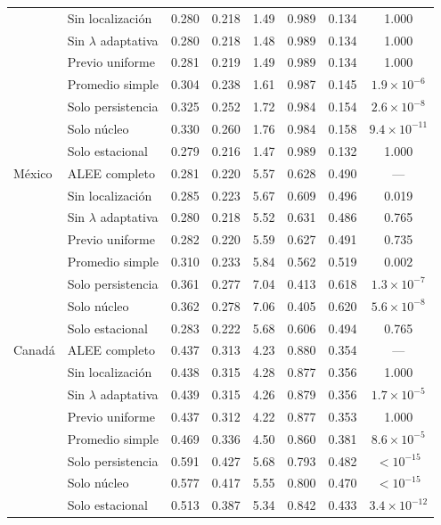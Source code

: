 \begin{longtable}{llcccccc}
 & Sin localización & 0.280 & 0.218 & 1.49 & 0.989 & 0.134 & 1.000 \\
 & Sin $\lambda$ adaptativa & 0.280 & 0.218 & 1.48 & 0.989 & 0.134 & 1.000 \\
 & Previo uniforme & 0.281 & 0.219 & 1.49 & 0.989 & 0.134 & 1.000 \\
 & Promedio simple & 0.304 & 0.238 & 1.61 & 0.987 & 0.145 & $1.9\times10^{-6}$ \\
 & Solo persistencia & 0.325 & 0.252 & 1.72 & 0.984 & 0.154 & $2.6\times10^{-8}$ \\
 & Solo núcleo & 0.330 & 0.260 & 1.76 & 0.984 & 0.158 & $9.4\times10^{-11}$ \\
 & Solo estacional & 0.279 & 0.216 & 1.47 & 0.989 & 0.132 & 1.000 \\
\midrule
México & ALEE completo & 0.281 & 0.220 & 5.57 & 0.628 & 0.490 & --- \\
 & Sin localización & 0.285 & 0.223 & 5.67 & 0.609 & 0.496 & 0.019 \\
 & Sin $\lambda$ adaptativa & 0.280 & 0.218 & 5.52 & 0.631 & 0.486 & 0.765 \\
 & Previo uniforme & 0.282 & 0.220 & 5.59 & 0.627 & 0.491 & 0.735 \\
 & Promedio simple & 0.310 & 0.233 & 5.84 & 0.562 & 0.519 & 0.002 \\
 & Solo persistencia & 0.361 & 0.277 & 7.04 & 0.413 & 0.618 & $1.3\times10^{-7}$ \\
 & Solo núcleo & 0.362 & 0.278 & 7.06 & 0.405 & 0.620 & $5.6\times10^{-8}$ \\
 & Solo estacional & 0.283 & 0.222 & 5.68 & 0.606 & 0.494 & 0.765 \\
\midrule
Canadá & ALEE completo & 0.437 & 0.313 & 4.23 & 0.880 & 0.354 & --- \\
 & Sin localización & 0.438 & 0.315 & 4.28 & 0.877 & 0.356 & 1.000 \\
 & Sin $\lambda$ adaptativa & 0.439 & 0.315 & 4.26 & 0.879 & 0.356 & $1.7\times10^{-5}$ \\
 & Previo uniforme & 0.437 & 0.312 & 4.22 & 0.877 & 0.353 & 1.000 \\
 & Promedio simple & 0.469 & 0.336 & 4.50 & 0.860 & 0.381 & $8.6\times10^{-5}$ \\
 & Solo persistencia & 0.591 & 0.427 & 5.68 & 0.793 & 0.482 & $<10^{-15}$ \\
 & Solo núcleo & 0.577 & 0.417 & 5.55 & 0.800 & 0.470 & $<10^{-15}$ \\
 & Solo estacional & 0.513 & 0.387 & 5.34 & 0.842 & 0.433 & $3.4\times10^{-12}$ \\

\end{longtable}
